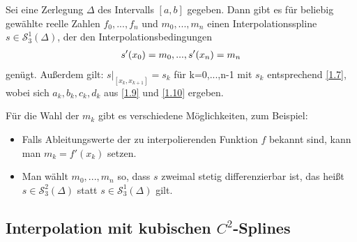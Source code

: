 \begin{proposition}
	Sei eine Zerlegung $\Delta$ des Intervalls $[a,b]$ gegeben. Dann gibt es für beliebig gewählte reelle Zahlen $f_0,...,f_n$ und $m_0,...,m_n$ einen Interpolationsspline $s\in\mathcal{S}^1_3(\Delta)$, der den Interpolationsbedingungen
	\begin{align}
		s'(x_0)=m_0,...,s'(x_n)=m_n\notag
	\end{align}
	genügt. Außerdem gilt: $s\vert_{[x_k,x_{k+1}]}=s_k$ für k=0,...,n-1 mit $s_k$ entsprechend \cref{1.7}, wobei sich $a_k,b_k,c_k,d_k$ aus \cref{1.9} und \cref{1.10} ergeben.
\end{proposition}

Für die Wahl der $m_k$ gibt es verschiedene Möglichkeiten, zum Beispiel:
\begin{itemize}
	\item Falls Ableitungswerte der zu interpolierenden Funktion $f$ bekannt sind, kann man $m_k=f'(x_k)$ setzen.
	\item Man wählt $m_0,...,m_n$ so, dass $s$ zweimal stetig differenzierbar ist, das heißt $s\in\mathcal{S}^2_3(\Delta)$ statt  $s\in\mathcal{S}^1_3(\Delta)$ gilt.
\end{itemize}

\subsection{Interpolation mit kubischen $C^2$-Splines}

